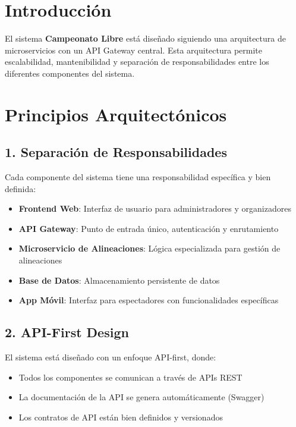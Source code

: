 \documentclass[
  spanish,
  11pt,
  letterpaper,
]{book}
\providecommand{\tightlist}{%
  \setlength{\itemsep}{0pt}\setlength{\parskip}{0pt}}
\begin{document}
\section{Introducción}\label{introducciuxf3n}

El sistema \textbf{Campeonato Libre} está diseñado siguiendo una
arquitectura de microservicios con un API Gateway central. Esta
arquitectura permite escalabilidad, mantenibilidad y separación de
responsabilidades entre los diferentes componentes del sistema.

\section{Principios
Arquitectónicos}\label{principios-arquitectuxf3nicos}

\subsection{1. Separación de
Responsabilidades}\label{separaciuxf3n-de-responsabilidades}

Cada componente del sistema tiene una responsabilidad específica y bien
definida:

\begin{itemize}
\tightlist
\item
  \textbf{Frontend Web}: Interfaz de usuario para administradores y
  organizadores
\item
  \textbf{API Gateway}: Punto de entrada único, autenticación y
  enrutamiento
\item
  \textbf{Microservicio de Alineaciones}: Lógica especializada para
  gestión de alineaciones
\item
  \textbf{Base de Datos}: Almacenamiento persistente de datos
\item
  \textbf{App Móvil}: Interfaz para espectadores con funcionalidades
  específicas
\end{itemize}

\subsection{2. API-First Design}\label{api-first-design}

El sistema está diseñado con un enfoque API-first, donde:

\begin{itemize}
\tightlist
\item
  Todos los componentes se comunican a través de APIs REST
\item
  La documentación de la API se genera automáticamente (Swagger)
\item
  Los contratos de API están bien definidos y versionados
\end{itemize}
\end{document}
